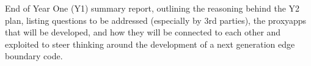 End of Year One (Y1) summary report, outlining the reasoning behind the Y2 plan, listing questions to be addressed
(especially by 3rd parties), the proxyapps that will be developed, and how they will be connected to each other
and exploited to steer thinking around the development of a next generation edge boundary code. 
